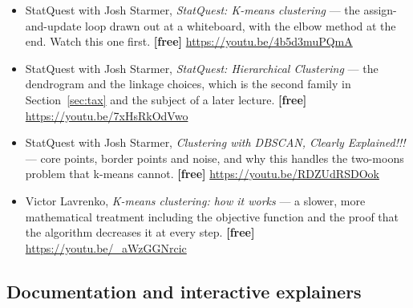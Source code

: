 \documentclass[11pt]{article}
\begin{document}
\begin{itemize}[leftmargin=*]
  \item StatQuest with Josh Starmer, \emph{StatQuest: K-means clustering} ---
    the assign-and-update loop drawn out at a whiteboard, with the elbow
    method at the end. Watch this one first. \textbf{[free]}
    \url{https://youtu.be/4b5d3muPQmA}
  \item StatQuest with Josh Starmer, \emph{StatQuest: Hierarchical
    Clustering} --- the dendrogram and the linkage choices, which is the
    second family in Section~\ref{sec:tax} and the subject of a later
    lecture. \textbf{[free]} \url{https://youtu.be/7xHsRkOdVwo}
  \item StatQuest with Josh Starmer, \emph{Clustering with DBSCAN, Clearly
    Explained!!!} --- core points, border points and noise, and why this
    handles the two-moons problem that k-means cannot. \textbf{[free]}
    \url{https://youtu.be/RDZUdRSDOok}
  \item Victor Lavrenko, \emph{K-means clustering: how it works} --- a slower,
    more mathematical treatment including the objective function and the
    proof that the algorithm decreases it at every step. \textbf{[free]}
    \url{https://youtu.be/_aWzGGNrcic}
\end{itemize}

\subsection*{Documentation and interactive explainers}
\end{document}
